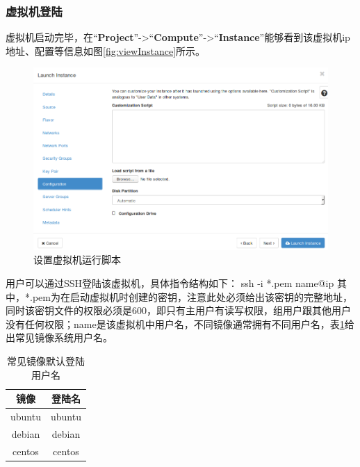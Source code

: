 \documentclass[12pt]{article}
\begin{document}
\subsubsection{虚拟机登陆}
虚拟机启动完毕，在``\textbf{Project}''->``\textbf{Compute}''->``\textbf{Instance}''能够看到该虚拟机ip地址、配置等信息如图\ref{fig:viewInstance}所示。
\begin{figure}[!htb]
\centering
\includegraphics[width=6in]{./figures/launchInstanceConfig}
\caption{设置虚拟机运行脚本}
\label{fig:launchInstanceConfig}
\end{figure}
用户可以通过SSH登陆该虚拟机，具体指令结构如下：
ssh -i *.pem name@ip
其中，*.pem为在启动虚拟机时创建的密钥，注意此处必须给出该密钥的完整地址，同时该密钥文件的权限必须是600，即只有主用户有读写权限，组用户跟其他用户没有任何权限；name是该虚拟机中用户名，不同镜像通常拥有不同用户名，表\ref{tab:userName}给出常见镜像系统用户名。
\begin{table}[!htb]
\centering
\caption{常见镜像默认登陆用户名}
\label{tab:userName}
\begin{tabular}{|c|c|} \hline
 镜像 &登陆名\\ \hline
 ubuntu& ubuntu\\ \hline
 debian& debian\\ \hline
 centos& centos\\ \hline
\end{tabular}
\end{table}
\end{document}

